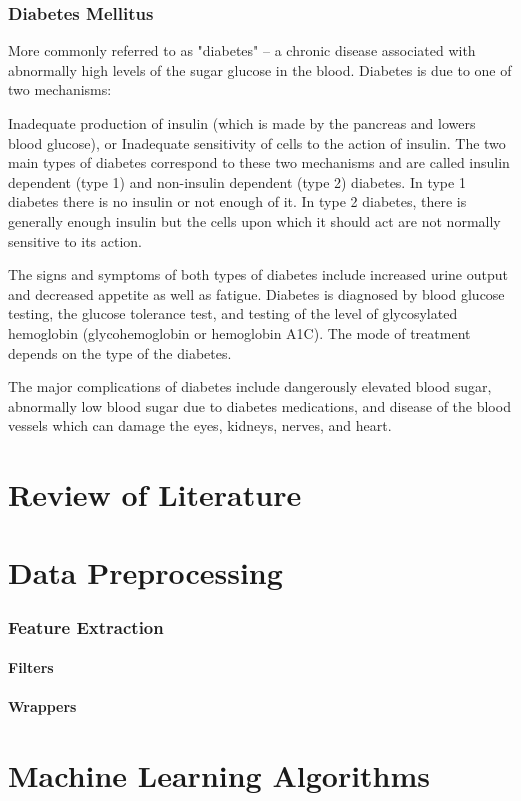 \documentclass[12pt]{article}
\begin{document}
\newpage
\section{Diabetes Mellitus}
More commonly referred to as "diabetes" -- a chronic disease associated with abnormally high levels of the sugar glucose in the blood. Diabetes is due to one of two mechanisms:

Inadequate production of insulin (which is made by the pancreas and lowers blood glucose), or
Inadequate sensitivity of cells to the action of insulin.
The two main types of diabetes correspond to these two mechanisms and are called insulin dependent (type 1) and non-insulin dependent (type 2) diabetes. In type 1 diabetes there is no insulin or not enough of it. In type 2 diabetes, there is generally enough insulin but the cells upon which it should act are not normally sensitive to its action.

The signs and symptoms of both types of diabetes include increased urine output and decreased appetite as well as fatigue. Diabetes is diagnosed by blood glucose testing, the glucose tolerance test, and testing of the level of glycosylated hemoglobin (glycohemoglobin or hemoglobin A1C). The mode of treatment depends on the type of the diabetes.

The major complications of diabetes include dangerously elevated blood sugar, abnormally low blood sugar due to diabetes medications, and disease of the blood vessels which can damage the eyes, kidneys, nerves, and heart.

\newpage
\part{Review of Literature}
\newpage
\part{Data Preprocessing}
\section{Feature Extraction}
\subsection{Filters}
\subsection{Wrappers}
\newpage
\part{Machine Learning Algorithms}
\newpage
\end{document}

